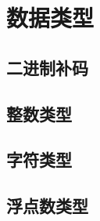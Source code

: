 
\section{数据类型}

\subsection{二进制补码}

\subsection{整数类型}

\subsection{字符类型}

\subsection{浮点数类型}

\pagebreak